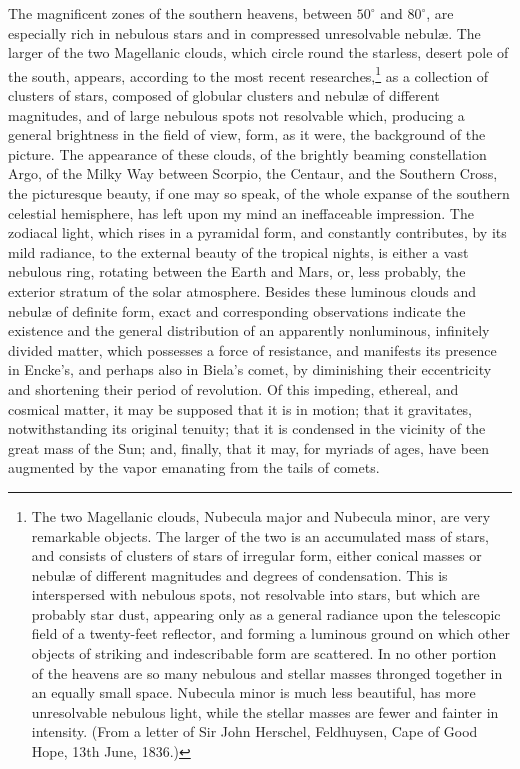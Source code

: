 The magnificent zones of the southern heavens, between $50^\circ$ and $80^\circ$, are especially rich in nebulous stars and in compressed unresolvable nebul{\ae}. The larger of the two Magellanic clouds, which circle round the starless, desert pole of the south, appears, according to the most recent researches,\footnote{The two Magellanic clouds, Nubecula major and Nubecula minor, are very remarkable objects. The larger of the two is an accumulated mass of stars, and consists of clusters of stars of irregular form, either conical masses or nebul{\ae} of different magnitudes and degrees of condensation. This is interspersed with nebulous spots, not resolvable into stars, but which are probably star dust, appearing only as a general radiance upon the telescopic field of a twenty-feet reflector, and forming a luminous ground on which other objects of striking and indescribable form are scattered. In no other portion of the heavens are so many nebulous and stellar masses thronged together in an equally small space. Nubecula minor is much less beautiful, has more unresolvable nebulous light, while the stellar masses are fewer and fainter in intensity. (From a letter of Sir John Herschel, Feldhuysen, Cape of Good Hope, 13th June, 1836.)} as a collection of clusters of stars, composed of globular clusters and nebul{\ae} of different magnitudes, and of large nebulous spots not resolvable which, producing a general brightness in the field of view, form, as it were, the background of the picture. The appearance of these clouds, of the brightly beaming constellation Argo, of the Milky Way between Scorpio, the Centaur, and the Southern Cross, the picturesque beauty, if one may so speak, of the whole expanse of the southern celestial hemisphere, has left upon my mind an ineffaceable impression. The zodiacal light, which rises in a pyramidal form, and constantly contributes, by its mild radiance, to the external beauty of the tropical nights, is either a vast nebulous ring, rotating between the Earth and Mars, or, less probably, the exterior stratum of the solar atmosphere. Besides these luminous clouds and nebul{\ae} of definite form, exact and corresponding observations indicate the existence and the general distribution of an apparently nonluminous, infinitely divided matter, which possesses a force of resistance, and manifests its presence in Encke's, and perhaps also in Biela's comet, by diminishing their eccentricity and shortening their period of revolution. Of this impeding, ethereal, and cosmical matter, it may be supposed that it is in motion; that it gravitates, notwithstanding its original tenuity; that it is condensed in the vicinity of the great mass of the Sun; and, finally, that it may, for myriads of ages, have been augmented by the vapor emanating from the tails of comets.

